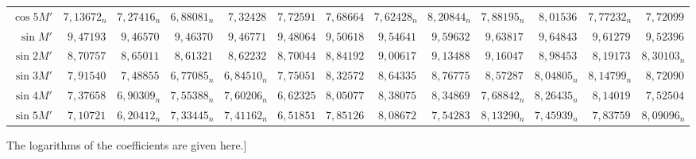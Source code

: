 \begin{landscape}
\begin{center}
\begin{tabular}{@{}r|*{11}{r|}r@{}}
\(\cos 5M'\) & \(7{,}13672_n\) & \(7{,}27416_n\) & \(6{,}88081_n\) & \(7{,}32428\) & \(7{,}72591\) & \(7{,}68664\) & \(7{,}62428_n\) & \(8{,}20844_n\) & \(7{,}88195_n\) & \(8{,}01536\) & \(7{,}77232_n\) & \(7{,}72099\)\\[.6em]
\(\sin M'\) & \(9{,}47193\) & \(9{,}46570\) & \(9{,}46370\) & \(9{,}46771\) & \(9{,}48064\) & \(9{,}50618\) & \(9{,}54641\) & \(9{,}59632\) & \(9{,}63817\) & \(9{,}64843\) & \(9{,}61279\) & \(9{,}52396\)\\
\(\sin 2M'\) & \(8{,}70757\) & \(8{,}65011\) & \(8{,}61321\) & \(8{,}62232\) & \(8{,}70044\) & \(8{,}84192\) & \(9{,}00617\) & \(9{,}13488\) & \(9{,}16047\) & \(8{,}98453\) & \(8{,}19173\) & \(8{,}30103_n\)\\
\(\sin 3M'\) & \(7{,}91540\) & \(7{,}48855\) & \(6{,}77085_n\) & \(6{,}84510_n\) & \(7{,}75051\) & \(8{,}32572\) & \(8{,}64335\) & \(8{,}76775\) & \(8{,}57287\) & \(8{,}04805_n\) & \(8{,}14799_n\) & \(8{,}72090\)\\
\(\sin 4M'\) & \(7{,}37658\) & \(6{,}90309_n\) & \(7{,}55388_n\) & \(7{,}60206_n\) & \(6{,}62325\) & \(8{,}05077\) & \(8{,}38075\) & \(8{,}34869\) & \(7{,}68842_n\) & \(8{,}26435_n\) & \(8{,}14019\) & \(7{,}52504\)\\
\(\sin 5M'\) & \(7{,}10721\) & \(6{,}20412_n\) & \(7{,}33445_n\) & \(7{,}41162_n\) & \(6{,}51851\) & \(7{,}85126\) & \(8{,}08672\) & \(7{,}54283\) & \(8{,}13290_n\) & \(7{,}45939_n\) & \(7{,}83759\) & \(8{,}09096_n\)\\
\end{tabular}
\end{center}
\par\noindent\hspace*{\parindent}The logarithms of the coefficients are given here.]
\endgroup
\end{landscape}
\clearpage
\endgroup

